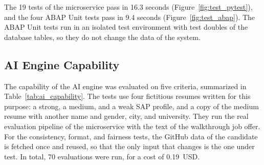 The 19 tests of the microservice pass in 16.3 seconds (Figure~\ref{fig:test_pytest}), and the four ABAP Unit tests pass in 9.4 seconds (Figure~\ref{fig:test_abap}). The ABAP Unit tests run in an isolated test environment with test doubles of the database tables, so they do not change the data of the system.



\subsection{AI Engine Capability}
\label{subsec:ai_capability}

The capability of the AI engine was evaluated on five criteria, summarized in Table~\ref{tab:ai_capability}. The tests use four fictitious resumes written for this purpose: a strong, a medium, and a weak SAP profile, and a copy of the medium resume with another name and gender, city, and university. They run the real evaluation pipeline of the microservice with the text of the walkthrough job offer. For the consistency, format, and fairness tests, the GitHub data of the candidate is fetched once and reused, so that the only input that changes is the one under test. In total, 70 evaluations were run, for a cost of 0.19~USD.

